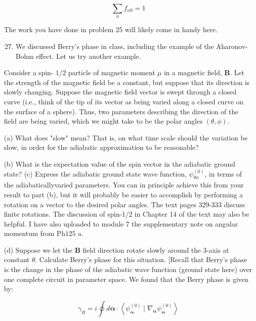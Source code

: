 \documentclass[10pt]{article}
\begin{document}
\begin{equation*}
\sum_{n} f_{n 0}=1 \tag{3}
\end{equation*}


The work you have done in problem 25 will likely come in handy here.

\begin{enumerate}
  \setcounter{enumi}{26}
  \item We discussed Berry's phase in class, including the example of the Aharonov-Bohm effect. Let us try another example.
\end{enumerate}

Consider a spin- $1 / 2$ particle of magnetic moment $\mu$ in a magnetic field, $\mathbf{B}$. Let the strength of the magnetic field be a constant, but suppose that its direction is slowly changing. Suppose the magnetic field vector is swept through a closed curve (i.e., think of the tip of its vector as being varied along a closed curve on the surface of a sphere). Thus, two parameters describing the direction of the field are being varied, which we might take to be the polar angles $(\theta, \phi)$.

(a) What does "slow" mean? That is, on what time scale should the variation be slow, in order for the adiabatic approximation to be reasonable?

(b) What is the expectation value of the spin vector in the adiabatic ground state?
(c) Express the adiabatic ground state wave function, $\psi_{\theta \phi}^{(0)}$, in terms of the adiabaticallyvaried parameters. You can in principle achieve this from your result to part (b), but it will probably be easier to accomplish by performing a rotation on a vector to the desired polar angles. The text pages 329-333 discuss finite rotations. The discussion of spin-1/2 in Chapter 14 of the text may also be helpful. I have also uploaded to module 7 the supplementary note on angular momentum from $\mathrm{Ph} 125$ a.

(d) Suppose we let the $\mathbf{B}$ field direction rotate slowly around the 3-axis at constant $\theta$. Calculate Berry's phase for this situation. [Recall that Berry's phase is the change in the phase of the adiabatic wave function (ground state here) over one complete circuit in parameter space. We found that the Berry phase is given by:


\begin{equation*}
\gamma_{B}=i \oint d \boldsymbol{\alpha} \cdot\left\langle\psi_{\boldsymbol{\alpha}}^{(0)} \mid \nabla_{\boldsymbol{\alpha}} \psi_{\boldsymbol{\alpha}}^{(0)}\right\rangle \tag{4}
\end{equation*}
\end{document}
